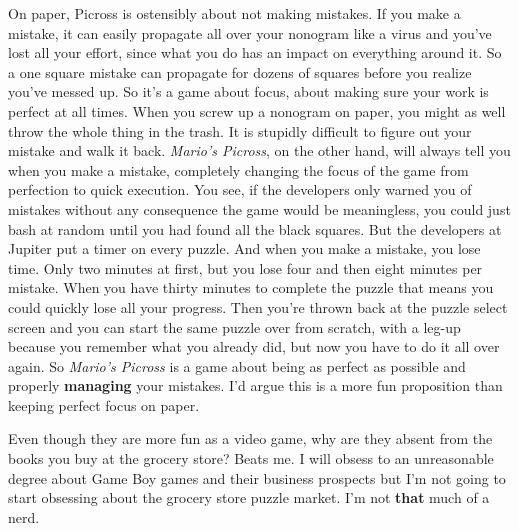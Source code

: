 \documentclass{book}
\begin{document}
On paper, Picross is ostensibly about not making mistakes. If you make a mistake, it can easily propagate all over your nonogram like a virus and you’ve lost all your effort, since what you do has an impact on everything around it. So a one square mistake can propagate for dozens of squares before you realize you’ve messed up. So it’s a game about focus, about making sure your work is perfect at all times. When you screw up a nonogram on paper, you might as well throw the whole thing in the trash. It is stupidly difficult to figure out your mistake and walk it back. \emph{Mario’s Picross}, on the other hand, will always tell you when you make a mistake, completely changing the focus of the game from perfection to quick execution. You see, if the developers only warned you of mistakes without any consequence the game would be meaningless, you could just bash at random until you had found all the black squares. But the developers at Jupiter put a timer on every puzzle. And when you make a mistake, you lose time. Only two minutes at first, but you lose four and then eight minutes per mistake. When you have thirty minutes to complete the puzzle that means you could quickly lose all your progress. Then you’re thrown back at the puzzle select screen and you can start the same puzzle over from scratch, with a leg-up because you remember what you already did, but now you have to do it all over again. So \emph{Mario’s Picross} is a game about being as perfect as possible and properly \textbf{managing} your mistakes. I’d argue this is a more fun proposition than keeping perfect focus on paper.

Even though they are more fun as a video game, why are they absent from the books you buy at the grocery store? Beats me. I will obsess to an unreasonable degree about Game Boy games and their business prospects but I’m not going to start obsessing about the grocery store puzzle market. I’m not \textbf{that} much of a nerd.
\end{document}
